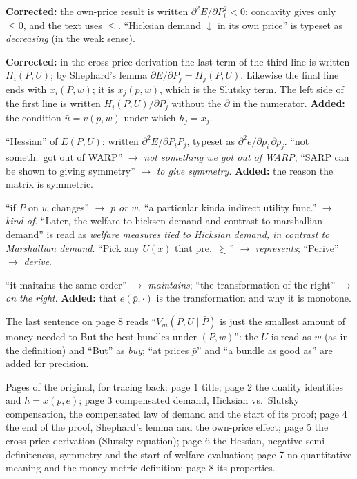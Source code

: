 \documentclass[11pt]{article}
\begin{document}
\begin{transcriptnotes}
  \item \textbf{Corrected:} the own-price result is written
        $\partial^2E/\partial P_i^2<0$; concavity gives only $\le 0$, and the text
        uses $\le$. ``Hicksian demand $\downarrow$ in its own price'' is typeset
        as \emph{decreasing} (in the weak sense).
  \item \textbf{Corrected:} in the cross-price derivation the last term of the
        third line is written $H_i(P,U)$; by Shephard's lemma
        $\partial E/\partial P_j=H_j(P,U)$. Likewise the final line ends
        with $x_i(P,w)$; it is $x_j(p,w)$, which is the Slutsky term. The left
        side of the first line is written $H_i(P,U)/\partial P_j$ without the
        $\partial$ in the numerator. \textbf{Added:} the condition
        $\bar u=v(p,w)$ under which $h_j=x_j$.
  \item ``Hessian'' of $E(P,U)$: written $\partial^2E/\partial P_iP_j$, typeset
        as $\partial^2 e/\partial p_i\,\partial p_j$. ``not someth.\ got out of
        WARP'' $\to$ \emph{not something we got out of WARP}; ``SARP can be shown
        to giving symmetry'' $\to$ \emph{to give symmetry}. \textbf{Added:} the
        reason the matrix is symmetric.
  \item ``if $P$ on $w$ changes'' $\to$ \emph{$p$ or $w$}. ``a particular kinda
        indirect utility func.'' $\to$ \emph{kind of}. ``Later, the welfare to
        hicksen demand and contrast to marshallian demand'' is read as
        \emph{welfare measures tied to Hicksian demand, in contrast to Marshallian
        demand}. ``Pick any $U(x)$ that pre.\ $\succsim$'' $\to$
        \emph{represents}; ``Perive'' $\to$ \emph{derive}.
  \item ``it maitains the same order'' $\to$ \emph{maintains}; ``the
        transformation of the right'' $\to$ \emph{on the right}.
        \textbf{Added:} that $e(\bar p,\cdot)$ is the transformation and why it is
        monotone.
  \item The last sentence on page 8 reads ``$V_m(P,U\mid\bar P)$ is just the
        smallest amount of money needed to But the best bundles under $(P,w)$'':
        the $U$ is read as $w$ (as in the definition) and ``But'' as \emph{buy};
        ``at prices $\bar p$'' and ``a bundle as good as'' are added for precision.
  \item Pages of the original, for tracing back: page 1 title; page 2 the duality
        identities and $h=x(p,e)$; page 3 compensated demand, Hicksian vs.\ Slutsky
        compensation, the compensated law of demand and the start of its proof;
        page 4 the end of the proof, Shephard's lemma and the own-price effect;
        page 5 the cross-price derivation (Slutsky equation); page 6 the Hessian,
        negative semi-definiteness, symmetry and the start of welfare evaluation;
        page 7 no quantitative meaning and the money-metric definition; page 8 its
        properties.
\end{transcriptnotes}
\end{document}

